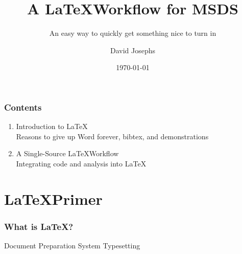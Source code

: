 \documentclass{beamer}\usepackage[]{graphicx}\usepackage[]{color}
\title{A \LaTeX Workflow for MSDS}
\subtitle{An easy way to quickly get something nice to turn in}
\author{David Josephs}
\date{\today}
\begin{document}
	\setcounter{showProgressBar}{0}
	\setcounter{showSlideNumbers}{0}

	\frame{\titlepage}

	\begin{frame}
		\frametitle{Contents}
		\begin{enumerate}[<+->]
			\item Introduction to \LaTeX \\ \textcolor{ExecusharesGrey}{\footnotesize\hspace{1em} Reasons to give up Word forever, bibtex, and demonstrations}
			\item A Single-Source \LaTeX Workflow  \\ \textcolor{ExecusharesGrey}{\footnotesize\hspace{1em} Integrating code and analysis into \LaTeX}
		\end{enumerate}
	\end{frame}

	\setcounter{framenumber}{0}
	\setcounter{showProgressBar}{1}
	\setcounter{showSlideNumbers}{1}
	\section{\LaTeX Primer}
		\begin{frame}
			\frametitle{What is \LaTeX?}
			\begin{outline}
\1 Document Preparation System
\2 Typesetting
			\end{outline}
		\end{frame}
\end{document}
